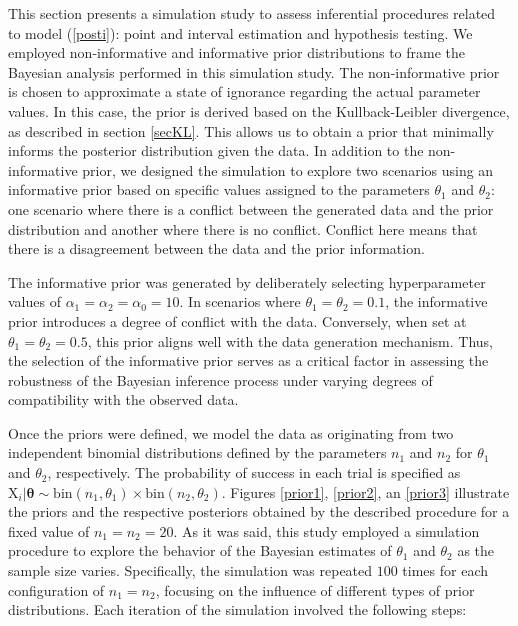 \documentclass[AMA,Times1COL]{WileyNJDv5} %
\newcommand{\bX}{\boldsymbol{\mathrm{X}}}
\begin{document}
This section presents a simulation study to assess inferential procedures related to model (\ref{posti}): point and interval estimation and hypothesis testing. We employed non-informative and informative prior distributions to frame the Bayesian analysis performed in this simulation study. The non-informative prior is chosen to approximate a state of ignorance regarding the actual parameter values. In this case, the prior is derived based on the Kullback-Leibler divergence, as described in section \ref{secKL}. This allows us to obtain a prior that minimally informs the posterior distribution given the data. In addition to the non-informative prior, we designed the simulation to explore two scenarios using an informative prior based on specific values assigned to the parameters $\theta_1$ and $\theta_2$: one scenario where there is a conflict between the generated data and the prior distribution and another where there is no conflict. Conflict here means that there is a disagreement between the data and the prior information.


The informative prior was generated by deliberately selecting hyperparameter values of $\alpha_1 = \alpha_2 = \alpha_0=10$. In scenarios where $\theta_1 = \theta_2 = 0.1$, the informative prior introduces a degree of conflict with the data. Conversely, when set at $\theta_1 = \theta_2 = 0.5$, this prior aligns well with the data generation mechanism. Thus, the selection of the informative prior serves as a critical factor in assessing the robustness of the Bayesian inference process under varying degrees of compatibility with the observed data.




Once the priors were defined, we model the data as originating from two independent binomial distributions defined by the parameters $n_1$ and $n_2$ for $\theta_1$ and $\theta_2$, respectively. The probability of success in each trial is specified as
$\bX_i \vert \boldsymbol{\theta} \sim \text{bin}(n_1, \theta_1) \times \text{bin}(n_2, \theta_2)$. Figures \ref{prior1}, \ref{prior2}, an \ref{prior3} illustrate the priors and the respective posteriors obtained by the described procedure for a fixed value of $n_1=n_2=20$. As it was said, this study employed a simulation procedure to explore the behavior of the Bayesian estimates of $\theta_1$ and $\theta_2$ as the sample size varies. Specifically, the simulation was repeated $100$ times for each configuration of $n_1=n_2$, focusing on the influence of different types of prior distributions. Each iteration of the simulation involved the following steps:
\end{document}
